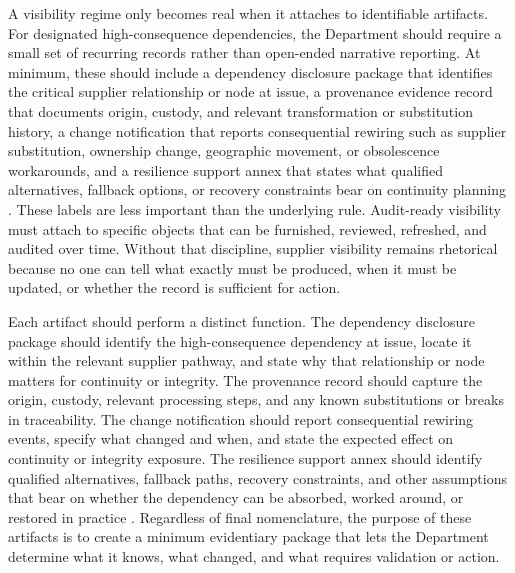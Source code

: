 A visibility regime only becomes real when it attaches to identifiable artifacts. For designated high-consequence dependencies, the Department should require a small set of recurring records rather than open-ended narrative reporting. At minimum, these should include a dependency disclosure package that identifies the critical supplier relationship or node at issue, a provenance evidence record that documents origin, custody, and relevant transformation or substitution history, a change notification that reports consequential rewiring such as supplier substitution, ownership change, geographic movement, or obsolescence workarounds, and a resilience support annex that states what qualified alternatives, fallback options, or recovery constraints bear on continuity planning \parencite{ch5_dodi424515,ch5_dfars2522467007,ch5_nist800161r1upd1}. These labels are less important than the underlying rule. Audit-ready visibility must attach to specific objects that can be furnished, reviewed, refreshed, and audited over time. Without that discipline, supplier visibility remains rhetorical because no one can tell what exactly must be produced, when it must be updated, or whether the record is sufficient for action.

Each artifact should perform a distinct function. The dependency disclosure package should identify the high-consequence dependency at issue, locate it within the relevant supplier pathway, and state why that relationship or node matters for continuity or integrity. The provenance record should capture the origin, custody, relevant processing steps, and any known substitutions or breaks in traceability. The change notification should report consequential rewiring events, specify what changed and when, and state the expected effect on continuity or integrity exposure. The resilience support annex should identify qualified alternatives, fallback paths, recovery constraints, and other assumptions that bear on whether the dependency can be absorbed, worked around, or restored in practice \parencite{ch5_dodi424515,ch5_dfars2522467007,ch5_nist800161r1upd1}. Regardless of final nomenclature, the purpose of these artifacts is to create a minimum evidentiary package that lets the Department determine what it knows, what changed, and what requires validation or action.

